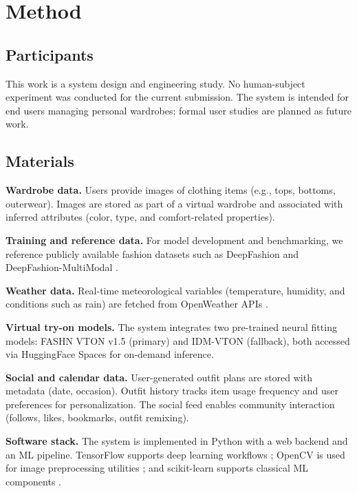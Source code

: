 \documentclass[stu,man]{apa7}
\begin{document}
\section{Method}
\subsection{Participants}
This work is a system design and engineering study.
No human-subject experiment was conducted for the current submission.
The system is intended for end users managing personal wardrobes; formal user studies are planned as future work.

\subsection{Materials}
\textbf{Wardrobe data.} Users provide images of clothing items (e.g., tops, bottoms, outerwear). Images are stored as part of a virtual wardrobe and associated with inferred attributes (color, type, and comfort-related properties).

\textbf{Training and reference data.} For model development and benchmarking, we reference publicly available fashion datasets such as DeepFashion \parencite{liuLQWTcvpr16DeepFashion} and DeepFashion-MultiModal \parencite{deepfashionmultimodal}.

\textbf{Weather data.} Real-time meteorological variables (temperature, humidity, and conditions such as rain) are fetched from OpenWeather APIs \parencite{openweatherapi}.

\textbf{Virtual try-on models.} The system integrates two pre-trained neural fitting models: FASHN VTON v1.5 (primary) and IDM-VTON (fallback), both accessed via HuggingFace Spaces for on-demand inference.

\textbf{Social and calendar data.} User-generated outfit plans are stored with metadata (date, occasion). Outfit history tracks item usage frequency and user preferences for personalization. The social feed enables community interaction (follows, likes, bookmarks, outfit remixing).

\textbf{Software stack.} The system is implemented in Python with a web backend and an ML pipeline.
TensorFlow supports deep learning workflows \parencite{abadi2016tensorflow}; OpenCV is used for image preprocessing utilities \parencite{opencvdocs}; and scikit-learn supports classical ML components \parencite{pedregosa2011scikit}.
\end{document}
